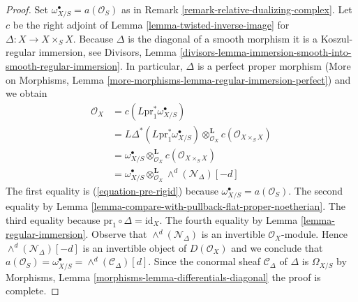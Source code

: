 \documentclass[10pt,a4paper]{amsart}
\theoremstyle{plain}
\theoremstyle{definition}
\theoremstyle{remark}
\numberwithin{equation}{subsection}
\begin{document}
\begin{proof}
Set $\omega_{X/S}^\bullet = a(\mathcal{O}_S)$ as in
Remark \ref{remark-relative-dualizing-complex}.
Let $c$ be the right adjoint of Lemma \ref{lemma-twisted-inverse-image} for
$\Delta : X \to X \times_S X$. Because $\Delta$
is the diagonal of a smooth morphism it is a
Koszul-regular immersion, see Divisors, Lemma
\ref{divisors-lemma-immersion-smooth-into-smooth-regular-immersion}.
In particular, $\Delta$ is a perfect proper morphism
(More on Morphisms, Lemma \ref{more-morphisms-lemma-regular-immersion-perfect})
and we obtain
\begin{align*}
\mathcal{O}_X
& =
c(L\text{pr}_1^*\omega_{X/S}^\bullet) \\
& =
L\Delta^*(L\text{pr}_1^*\omega_{X/S}^\bullet)
\otimes_{\mathcal{O}_X}^\mathbf{L}
c(\mathcal{O}_{X \times_S X}) \\
& =
\omega_{X/S}^\bullet \otimes_{\mathcal{O}_X}^\mathbf{L}
c(\mathcal{O}_{X \times_S X}) \\
& =
\omega_{X/S}^\bullet
\otimes_{\mathcal{O}_X}^\mathbf{L}
\wedge^d(\mathcal{N}_\Delta)[-d]
\end{align*}
The first equality is (\ref{equation-pre-rigid}) because
$\omega_{X/S}^\bullet = a(\mathcal{O}_S)$. The second equality by
Lemma \ref{lemma-compare-with-pullback-flat-proper-noetherian}.
The third equality because $\text{pr}_1 \circ \Delta = \text{id}_X$.
The fourth equality by Lemma \ref{lemma-regular-immersion}.
Observe that $\wedge^d(\mathcal{N}_\Delta)$ is an invertible
$\mathcal{O}_X$-module. Hence $\wedge^d(\mathcal{N}_\Delta)[-d]$
is an invertible object of $D(\mathcal{O}_X)$ and we conclude that
$a(\mathcal{O}_S) = \omega_{X/S}^\bullet = \wedge^d(\mathcal{C}_\Delta)[d]$.
Since the conormal sheaf $\mathcal{C}_\Delta$ of $\Delta$ is
$\Omega_{X/S}$ by
Morphisms, Lemma \ref{morphisms-lemma-differentials-diagonal}
the proof is complete.
\end{proof}
\end{document}
